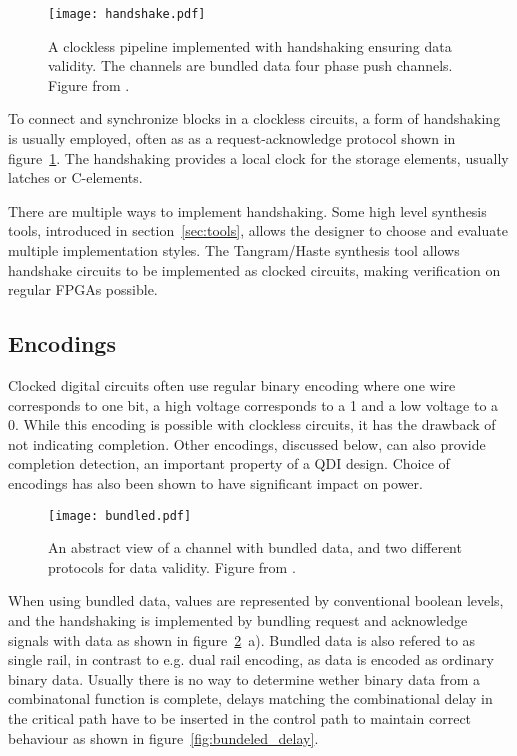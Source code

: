 \begin{figure}[htbp]
  \centering
  \texttt{[image: handshake.pdf]}
  \caption{A clockless pipeline implemented with handshaking ensuring
    data validity. The channels are bundled data four phase push
    channels. Figure from \cite{sparso}.}
  \label{fig:handshake}
\end{figure}

To connect and synchronize blocks in a clockless circuits, a form of
handshaking is usually employed, often as as a request-acknowledge
protocol shown in figure~\ref{fig:handshake}. The handshaking provides
a local clock for the storage elements, usually latches or C-elements.

There are multiple ways to implement handshaking. Some high level
synthesis tools, introduced in section~\ref{sec:tools}, allows the
designer to choose and evaluate multiple implementation styles. The
Tangram/Haste synthesis tool allows handshake circuits to be
implemented as clocked circuits, making verification on regular FPGAs
 possible.

\subsection{Encodings}

Clocked digital circuits often use regular binary encoding where one
wire corresponds to one bit, a high voltage corresponds to a 1 and a
low voltage to a 0. While this encoding is possible with clockless
circuits, it has the drawback of not indicating completion. Other
encodings, discussed below, can also provide completion detection, an
important property of a QDI design. Choice of encodings has also been
shown to have significant impact on power.
 
\begin{figure}[htbp]
  \centering
  \texttt{[image: bundled.pdf]}
  \caption{An abstract view of a channel with bundled data, and two
    different protocols for data validity. Figure from \cite{sparso}.}
  \label{fig:bundled}
\end{figure}

When using bundled data, values are represented by conventional
boolean levels, and the handshaking is implemented by bundling request
and acknowledge signals with data as shown in
figure~\ref{fig:bundled}~a). Bundled data is also refered to as single
rail, in contrast to e.g. dual rail encoding, as data is encoded as
ordinary binary data. Usually there is no way to determine wether
binary data from a combinatonal function is complete, delays matching
the combinational delay in the critical path have to be inserted in
the control path to maintain correct behaviour as shown in
figure~\ref{fig:bundeled_delay}.

